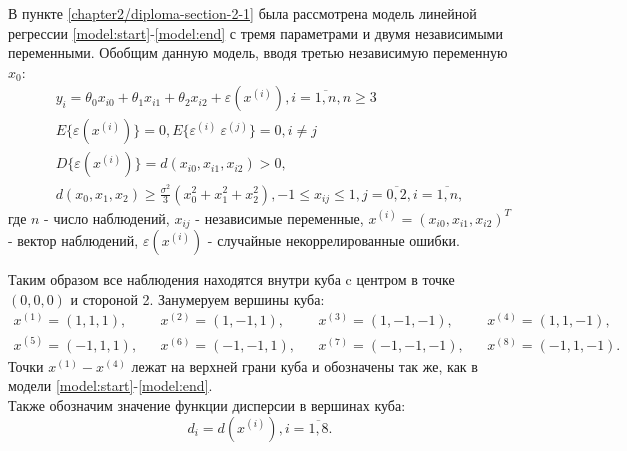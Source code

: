 В пункте \ref{chapter2/diploma-section-2-1} была рассмотрена модель линейной регрессии \eqref{model:start}-\eqref{model:end} с тремя параметрами и двумя независимыми переменными.
Обобщим данную модель, вводя третью независимую переменную $x_0$:
\begin{gather} \label{model-3x:start}
y_i = \theta_0 x_{i0} + \theta_1 x_{i1} + \theta_2 x_{i2} + \varepsilon(x^{(i)}), i = \overline{1, n}, n \ge 3 \\
E\{ \varepsilon(x^{(i)}) \} = 0, E\{ \varepsilon^{(i)}\ \varepsilon^{(j)} \} = 0, i \ne j \\
D\{ \varepsilon(x^{(i)}) \} = d(x_{i0}, x_{i1}, x_{i2}) > 0, \\
d(x_0, x_1, x_2) \ge \frac{\sigma^2}{3}(x_0^2 + x_1^2 + x_2^2) \label{model-3x:end},
-1 \le x_{ij} \le 1, j = \overline{0, 2}, i = \overline{1, n},
\end{gather}
где $n$ - число наблюдений, $x_{ij}$ - независимые переменные, $x^{(i)} = (x_{i0}, x_{i1}, x_{i2})^T$ - вектор наблюдений, $\varepsilon(x^{(i)})$ - случайные некоррелированные ошибки.

Таким образом все наблюдения находятся внутри куба c центром в точке $(0, 0, 0)$ и стороной 2.
Занумеруем вершины куба:
\begin{align*}
x^{(1)} = (1, 1, 1), && x^{(2)} = (1, -1, 1), && x^{(3)} = (1, -1, -1), && x^{(4)} = (1, 1, -1),\\
x^{(5)} = (-1, 1, 1), && x^{(6)} = (-1, -1, 1), && x^{(7)} = (-1, -1, -1), && x^{(8)} = (-1, 1, -1).
\end{align*}
Точки $x^{(1)}-x^{(4)}$ лежат на верхней грани куба и обозначены так же, как в модели \eqref{model:start}-\eqref{model:end}.\\
Также обозначим значение функции дисперсии в вершинах куба:
\begin{equation}
d_i = d(x^{(i)}), i = \overline{1, 8}.
\end{equation}

